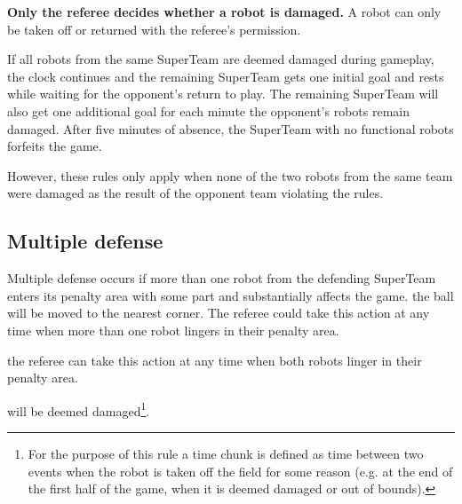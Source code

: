 \documentclass{article}
\begin{document}
\textbf{Only the referee decides whether a robot is damaged.} A robot can only
be taken off or returned with the referee's permission.

{
If all robots from the same SuperTeam are deemed damaged during gameplay, the
clock continues and the remaining SuperTeam gets one initial goal and rests
while waiting for the opponent's return to play. The remaining SuperTeam will
also get one additional goal for each minute the opponent's robots remain
damaged. After five minutes of absence, the SuperTeam with no functional robots
forfeits the game.
}

However, these rules only apply when none of the two robots from the same team
were damaged as the result of the opponent team violating the rules.

\subsection{Multiple defense \label{ref-013}}

Multiple defense occurs if more than one robot from the defending SuperTeam
enters its penalty area with some part and substantially affects the game.
 the ball will be moved to the nearest corner. The referee could take this
action at any time when more than one robot lingers in their penalty area.

 the referee can take this action at any time when both
robots linger in their penalty area.

will be deemed damaged\footnote{For the purpose of this rule a time chunk is
defined as time between two events when the robot is taken off the field for
some reason (e.g. at the end of the first half of the game, when it is deemed
damaged or out of bounds).}.
\end{document}
